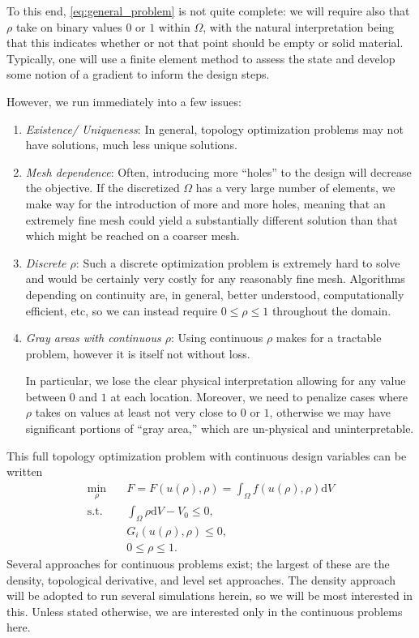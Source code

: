 To this end, \autoref{eq:general_problem} is not quite complete: we will require also
that $\rho$ take on binary values $0$ or $1$ within $\Omega$, with the natural interpretation being that
this indicates whether or not that point should be empty or solid material. Typically, one will
use a finite element method to assess the state and develop some notion of a gradient to inform the design steps.

However, we run immediately into a few issues:
\begin{enumerate}
    \item \textit{Existence/ Uniqueness}: In general, topology optimization problems may not have solutions, much less unique solutions.
    \item \textit{Mesh dependence}: Often, introducing more ``holes'' to the design will decrease the objective.
        If the discretized $\Omega$ has a very large number of elements, we make way for the introduction of more and more
        holes, meaning that an extremely fine mesh could yield a substantially different solution than that
        which might be reached on a coarser mesh.
    \item \textit{Discrete $\rho$}: Such a discrete optimization problem is extremely hard to solve and would be certainly
        very costly for any reasonably fine mesh. Algorithms depending on continuity are, in general, better 
        understood, computationally efficient, etc, so we can instead require $0 \leq \rho \leq 1$ throughout
        the domain.
    \item \textit{Gray areas with continuous $\rho$}: Using continuous $\rho$ makes for a tractable problem,
        however it is itself not without loss.
        
        In particular, we lose the clear physical interpretation
        allowing for any value between $0$ and $1$ at each location. Moreover, we need to penalize
        cases where $\rho$ takes on values at least not very close to $0$ or $1$, otherwise we may have
        significant portions of ``gray area,'' which are un-physical and uninterpretable.
\end{enumerate}

This full topology optimization problem with continuous design variables can be written
\begin{equation}\label{eq:general_continuous}
    \begin{aligned}
        \min_{\rho} &\quad F = F(u(\rho), \rho)=\int_\Omega f(u(\rho), \rho)\mathrm{d}V\\
        \text{s.t.} &\quad \int_\Omega \rho \mathrm{d}V - V_0 \leq 0,\\
            &\quad G_i(u(\rho), \rho) \leq 0,\\
            &\quad 0 \leq \rho \leq 1.
    \end{aligned}
\end{equation}
Several approaches for continuous problems exist; the largest of these are the density, topological
derivative, and level set approaches. The density approach will be adopted to run several simulations herein,
so we will be most interested in this. Unless stated otherwise, we are interested only in the continuous problems here.

